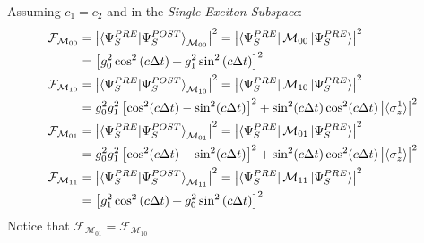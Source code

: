 \documentclass[a4paper,12pt]{article}
\begin{document}
Assuming $ c_1 = c_2 $ and in the \textit{Single Exciton Subspace}:
\begin{align}
	\mathcal{F}_{\mathcal{M}_{00}} &= \left| \braket{\Psi_{S}^{PRE} | \Psi_{S}^{POST}}_{\mathcal{M}_{00}} \right|^2 = \left| \bra{\Psi_{S}^{PRE}}\mathcal{M}_{00} \ket{\Psi_{S}^{PRE}} \right|^2 \notag \\
	&= \left[g_0^2 \cos^2{\left(c \Delta t \right)} + g_1^2 \sin^2{\left(c \Delta t \right)}\right]^{2} \label{eq:fidelity_M00} \\
	\mathcal{F}_{\mathcal{M}_{10}} &= \left| \braket{\Psi_{S}^{PRE} | \Psi_{S}^{POST}}_{\mathcal{M}_{10}} \right|^2 = \left| \bra{\Psi_{S}^{PRE}}\mathcal{M}_{10} \ket{\Psi_{S}^{PRE}} \right|^2 \notag \\
	&= g_0^2 g_1^2 \left[ \cos^2(c \Delta t) - \sin^2(c \Delta t) \right]^2 + \sin^2(c \Delta t) \cos^2(c \Delta t) \left| \braket{\sigma_{z}^{1}} \right|^2 \label{eq:fidelity_M10} \\
	\mathcal{F}_{\mathcal{M}_{01}} &= \left| \braket{\Psi_{S}^{PRE} | \Psi_{S}^{POST}}_{\mathcal{M}_{01}} \right|^2 = \left| \bra{\Psi_{S}^{PRE}}\mathcal{M}_{01} \ket{\Psi_{S}^{PRE}} \right|^2 \notag \\
	&= g_0^2 g_1^2 \left[ \cos^2(c \Delta t) - \sin^2(c \Delta t) \right]^2 + \sin^2(c \Delta t) \cos^2(c \Delta t) \left| \braket{\sigma_{z}^{1}} \right|^2 \label{eq:fidelity_M01} \\
	\mathcal{F}_{\mathcal{M}_{11}} &= \left| \braket{\Psi_{S}^{PRE} | \Psi_{S}^{POST}}_{\mathcal{M}_{11}} \right|^2 = \left| \bra{\Psi_{S}^{PRE}}\mathcal{M}_{11} \ket{\Psi_{S}^{PRE}} \right|^2 \notag \\
	&= \left[g_1^2 \cos^2{\left(c \Delta t \right)} + g_0^2 \sin^2{\left(c \Delta t \right)} \right]^{2} \label{eq:fidelity_M11}
\end{align}
Notice that $ \mathcal{F}_{\mathcal{M}_{01}} = \mathcal{F}_{\mathcal{M}_{10}} $

\newpage
\end{document}
